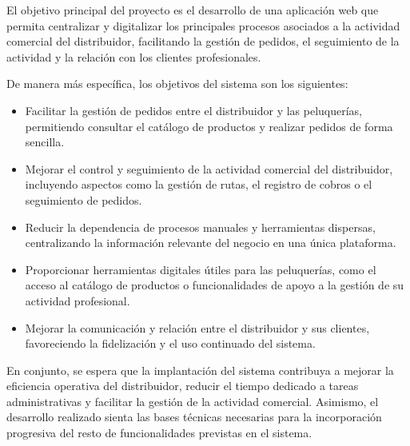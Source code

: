 El objetivo principal del proyecto es el desarrollo de una aplicación web que permita centralizar y digitalizar los principales procesos asociados a la actividad comercial del distribuidor, facilitando la gestión de pedidos, el seguimiento de la actividad y la relación con los clientes profesionales.

De manera más específica, los objetivos del sistema son los siguientes:

\begin{itemize}
\item Facilitar la gestión de pedidos entre el distribuidor y las peluquerías, permitiendo consultar el catálogo de productos y realizar pedidos de forma sencilla.

\item Mejorar el control y seguimiento de la actividad comercial del distribuidor, incluyendo aspectos como la gestión de rutas, el registro de cobros o el seguimiento de pedidos.

\item Reducir la dependencia de procesos manuales y herramientas dispersas, centralizando la información relevante del negocio en una única plataforma.

\item Proporcionar herramientas digitales útiles para las peluquerías, como el acceso al catálogo de productos o funcionalidades de apoyo a la gestión de su actividad profesional.

\item Mejorar la comunicación y relación entre el distribuidor y sus clientes, favoreciendo la fidelización y el uso continuado del sistema.

\end{itemize}

En conjunto, se espera que la implantación del sistema contribuya a mejorar la eficiencia operativa del distribuidor, reducir el tiempo dedicado a tareas administrativas y facilitar la gestión de la actividad comercial. Asimismo, el desarrollo realizado sienta las bases técnicas necesarias para la incorporación progresiva del resto de funcionalidades previstas en el sistema.
